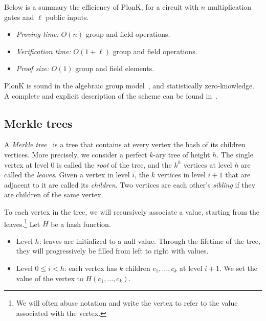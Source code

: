 Below is a summary the efficiency of PlonK, for a circuit with $n$ multiplication gates and $\ell$ public inputs.
\begin{itemize}
	\item \emph{Proving time:} $O(n)$ group and field operations. 
	\item \emph{Verification time:} $O(1+\ell)$ group and field operations.
	\item \emph{Proof size:} $O(1)$ group and field elements.
\end{itemize}

PlonK is sound in the algebraic group model~\cite{fuchsbauer2018algebraic}, and statistically zero-knowledge. A complete and explicit description of the scheme can be found in~\cite[Section~8]{gabizon2019plonk}.

\subsection{Merkle trees}\label{sec:merkle_trees}

A \emph{Merkle tree}~\cite{merkle1987digital} is a tree that contains at every vertex the hash of its children vertices. More precisely, we consider a perfect $k$-ary tree of height $h$. The single vertex at level $0$ is called the \emph{root} of the tree, and the $k^{h}$ vertices at level $h$ are called the \emph{leaves}. Given a vertex in level $i$, the $k$ vertices in level $i+1$ that are adjacent to it are called its \emph{children}. Two vertices are each other's \emph{sibling} if they are children of the same vertex.


To each vertex in the tree, we will recursively associate a value, starting from the leaves.\footnote{We will often abuse notation and write the vertex to refer to the value associated with the vertex.} Let $H$ be a hash function. 
\begin{itemize}
	\item Level $h$: leaves are initialized to a null value. Through the lifetime of the tree, they will progressively be filled from left to right with values.
	\item Level $0\leq i <h$: each vertex has $k$ children $c_1,\dots, c_k$ at level $i+1$. We set the value of the vertex to $H({c_1}, \dots, {c_k})$. 
\end{itemize}

